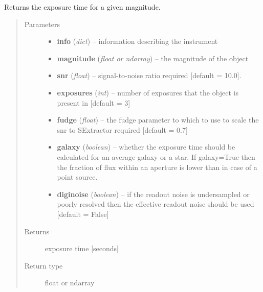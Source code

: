 \documentclass[a4paper,11pt,english]{sphinxmanual}
\begin{document}
\begin{fulllineitems}
\label{ETC:ETC.ETC.exposureTime}
Returns the exposure time for a given magnitude.
\begin{quote}\begin{description}
\item[{Parameters}] \leavevmode\begin{itemize}
\item {} 
\textbf{info} (\emph{dict}) -- information describing the instrument

\item {} 
\textbf{magnitude} (\emph{float or ndarray}) -- the magnitude of the object

\item {} 
\textbf{snr} (\emph{float}) -- signal-to-noise ratio required {[}default = 10.0{]}.

\item {} 
\textbf{exposures} (\emph{int}) -- number of exposures that the object is present in {[}default = 3{]}

\item {} 
\textbf{fudge} (\emph{float}) -- the fudge parameter to which to use to scale the snr to SExtractor required {[}default = 0.7{]}

\item {} 
\textbf{galaxy} (\emph{boolean}) -- whether the exposure time should be calculated for an average galaxy or a star.
If galaxy=True then the fraction of flux within an aperture is lower than in case of a point source.

\item {} 
\textbf{diginoise} (\emph{boolean}) -- if the readout noise is undersampled or poorly resolved then the effective readout noise
should be used {[}default = False{]}

\end{itemize}

\item[{Returns}] \leavevmode
exposure time {[}seconds{]}

\item[{Return type}] \leavevmode
float or ndarray

\end{description}\end{quote}

\end{fulllineitems}
\end{document}

